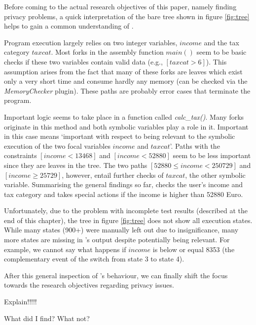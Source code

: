 \medskip

Before coming to the actual research objectives of this paper, namely finding privacy problems, a quick interpretation of the bare tree shown in figure \ref{fig:tree} helps to gain a common understanding of \app.

Program execution largely relies on two integer variables, $income$ and the tax category $taxcat$.
Most forks in the assembly function $main()$ seem to be basic checks if these two variables contain valid data (e.g., $[taxcat > 6]$).
This assumption arises from the fact that many of these forks are leaves which exist only a very short time and consume hardly any memory (can be checked via the \textit{MemoryChecker} plugin).
These paths are probably error cases that terminate the program.

Important logic seems to take place in a function called \textit{calc\_tax()}.
Many forks originate in this method and both symbolic variables play a role in it.
Important in this case means `important with respect to being relevant to the symbolic execution of the two focal variables $income$ and $taxcat$'.
Paths with the constraints $[income < 13468]$ and $[income < 52880]$ seem to be less important since they are leaves in the tree.
The two paths $[52880 \le income < 250729]$ and $[income \ge 25729]$, however, entail further checks of $taxcat$, the other symbolic variable.
Summarising the general findings so far, \app checks the user's income and tax category and takes special actions if the income is higher than 52880 Euro.

Unfortunately, due to the problem with incomplete test results (described at the end of this chapter), the tree in figure \ref{fig:tree} does not show all execution states.
While many states (900+) were manually left out due to insignificance, many more states are missing in \sse's output despite potentially being relevant.
For example, we cannot say what happens if $income$ is below or equal 8353 (the complementary event of the switch from state 3 to state 4).

\medskip

After this general inspection of \app's behaviour, we can finally shift the focus towards the research objectives regarding privacy issues.
 




\medskip

Explain!!!!!\todo{!}


What did I find? What not?\todo{!}

